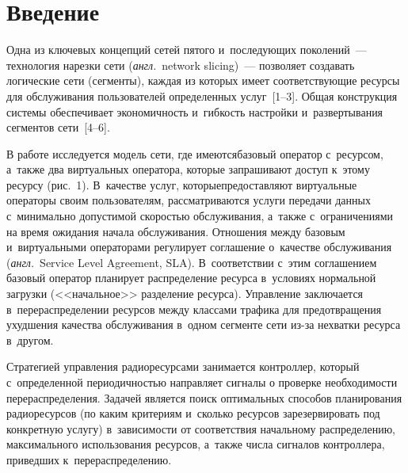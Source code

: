 
  



\thispagestyle{headings}

\begin{multicols}{2}

\label{st\stat}
  
  \section{Введение}
  
  Одна из ключевых концепций сетей пятого и~последующих поколений~--- 
технология нарезки сети (\textit{англ.}\ network slicing)~--- позволяет создавать 
логические сети (сегменты), каждая из которых имеет соответствующие 
ресурсы для обслуживания пользователей определенных услуг~[1--3]. Общая 
конструкция системы обеспечивает экономичность и~гибкость настройки 
и~развертывания сегментов сети~[4--6]. 
  
  В работе исследуется модель сети, где имеются\linebreak базовый оператор 
с~ресурсом, а~также два виртуальных оператора, которые запрашивают доступ 
к~этому ресурсу (рис.~1). В~качестве услуг, которые\linebreak предоставляют 
виртуальные операторы своим пользователям, рассматриваются услуги 
передачи данных с~минимально допустимой скоростью обслуживания, 
а~также с~ограничениями на время ожидания начала обслуживания. Отношения между 
базовым и~виртуальными операторами регулирует соглашение о~качестве 
обслуживания (\textit{англ.}\ Service Level Agreement, SLA). В~соответствии с~этим 
соглашением базовый оператор планирует распределение ресурса в~условиях 
нормальной загрузки (<<начальное>> разделение ресурса). Управ\-ле\-ние 
заключается в~перераспределении ресурсов между классами трафика для 
предотвращения ухудшения качества обслуживания в~одном сегменте сети 
из-за нехватки ресурса в~другом. 

Стратегией управ\-ле\-ния радиоресурсами 
занимается контроллер, который с~определенной периодичностью направляет 
сигналы о проверке необходимости перераспределения. Задачей является поиск 
оптимальных способов планирования радиоресурсов (по каким критериям 
и~сколько ресурсов зарезервировать под конкретную услугу) в~зависимости от 
соответствия начальному распределению, максимального использования 
ресурсов, а~также чис\-ла сигналов контроллера, приведших 
к~перераспределению. 




\end{multicols}
